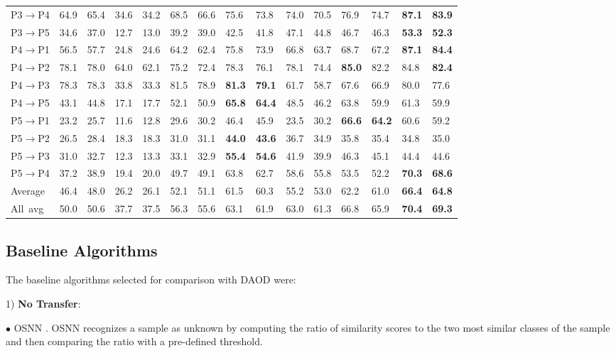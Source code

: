 \documentclass[journal]{IEEEtran}
\begin{document}
\begin{table*}[t]
\begin{tabular}{p{0.75cm}p{0.5cm}p{0.5cm}p{0.5cm}p{0.5cm}p{0.5cm}p{0.5cm}p{0.5cm}p{0.5cm}p{0.5cm}p{0.5cm}p{0.5cm}p{0.5cm}p{0.5cm}p{0.5cm}}
P3$\rightarrow$P4 &64.9&65.4&34.6&34.2&68.5&66.6&75.6&73.8&74.0&70.5&76.9&74.7&\textbf{87.1}&\textbf{83.9}\\
P3$\rightarrow$P5 &34.6&37.0&12.7&13.0&39.2&39.0&42.5&41.8&47.1&44.8&46.7&46.3&\textbf{53.3}&\textbf{52.3}\\
P4$\rightarrow$P1 &56.5&57.7&24.8&24.6&64.2&62.4&75.8&73.9&66.8&63.7&68.7&67.2&\textbf{87.1}&\textbf{84.4}\\
P4$\rightarrow$P2 &78.1&78.0&64.0&62.1&75.2&72.4&78.3&76.1&78.1&74.4&\textbf{85.0}&{82.2}&{84.8}&\textbf{82.4}\\
P4$\rightarrow$P3 &78.3&78.3&33.8&33.3&81.5&78.9&\textbf{81.3}&\textbf{79.1}&61.7&58.7&67.6&66.9&{80.0}&77.6\\
P4$\rightarrow$P5 &43.1&44.8&17.1&17.7&52.1&50.9&\textbf{65.8}&\textbf{64.4}&48.5&46.2&{63.8}&59.9&61.3&{59.9}\\
P5$\rightarrow$P1 &23.2&25.7&11.6&12.8&29.6&30.2&46.4&45.9&23.5&30.2&\textbf{66.6}&\textbf{64.2}&60.6&59.2\\
P5$\rightarrow$P2 &26.5&28.4&18.3&18.3&31.0&31.1&\textbf{44.0}&\textbf{43.6}&36.7&34.9&{35.8}&{35.4}&34.8&35.0\\
P5$\rightarrow$P3 &31.0&32.7&12.3&13.3&33.1&32.9&\textbf{55.4}&\textbf{54.6}&41.9&39.9&{46.3}&45.1&{44.4}&{44.6}\\
P5$\rightarrow$P4 &37.2&38.9&19.4&20.0&49.7&49.1&63.8&62.7&58.6&55.8&53.5&52.2&\textbf{70.3}&\textbf{68.6}\\
\hline
Average &46.4&48.0&26.2&26.1&52.1&51.1&61.5&60.3&55.2&53.0&62.2&61.0&\textbf{66.4}&\textbf{64.8}\\
\hline
\hline
All~avg&50.0&50.6&37.7&37.5&56.3&55.6&63.1&61.9&63.0&61.3&66.8&65.9&\textbf{70.4}&\textbf{69.3}\\
\hline
\end{tabular}
\end{table*}
\vspace{-0.2cm}


\subsection{Baseline Algorithms}
The baseline algorithms selected for comparison with DAOD were:

1) \textbf{No Transfer}:

$\bullet$ OSNN \cite{DBLP:journals/ml/Mendes-JuniorSW17}.  OSNN recognizes a sample as unknown by computing the ratio of similarity scores to the two most similar classes of the sample and then comparing the ratio with a pre-defined threshold.
\end{document}
